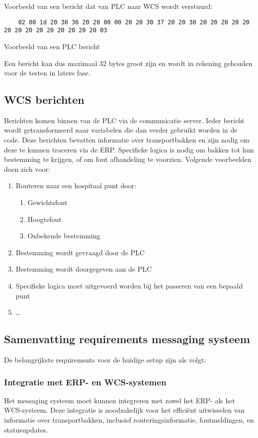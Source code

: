 Voorbeeld van een bericht dat van PLC naar WCS wordt verstuurd: 
\begin{listing}[h!]
  \begin{verbatim}
    02 00 1d 20 30 36 20 20 00 00 20 20 30 37 20 20 30 20 20 20 20 20 20 20 20 20 20 20 20 20 20 03
  \end{verbatim}
  \caption[Voorbeeld PLC bericht]{Voorbeeld van een PLC bericht}
\end{listing}

Een bericht kan dus maximaal 32 bytes groot zijn en wordt in rekening gehouden voor de testen in latere fase.

\subsection{WCS berichten} 
Berichten komen binnen van de PLC via de communicatie server. Ieder bericht wordt getransformeerd naar variabelen die dan verder gebruikt worden in de code.
Deze berichten bevatten informatie over transportbakken en zijn nodig om deze te kunnen traceren via de ERP.
Specifieke logica is nodig om bakken tot hun bestemming te krijgen, of om fout afhandeling te voorzien.
Volgende voorbeelden doen zich voor:
\begin{enumerate}
  \item Routeren naar een hospitaal punt door: 
  \begin{enumerate}
    \item Gewichtsfout
    \item Hoogtefout
    \item Onbekende bestemming
  \end{enumerate}
  \item Bestemming wordt gevraagd door de PLC
  \item Bestemming wordt doorgegeven aan de PLC 
  \item Specifieke logica moet uitgevoerd worden bij het passeren van een bepaald punt
  \item \dots
\end{enumerate}


\subsection{Samenvatting requirements messaging systeem}
De belangrijkste requirements voor de huidige setup zijn als volgt:

\subsubsection{Integratie met ERP- en WCS-systemen}
Het messaging systeem moet kunnen integreren met zowel het ERP- als het WCS-systeem. 
Deze integratie is noodzakelijk voor het efficiënt uitwisselen van informatie over transportbakken, inclusief routeringsinformatie, 
foutmeldingen, en statusupdates.

